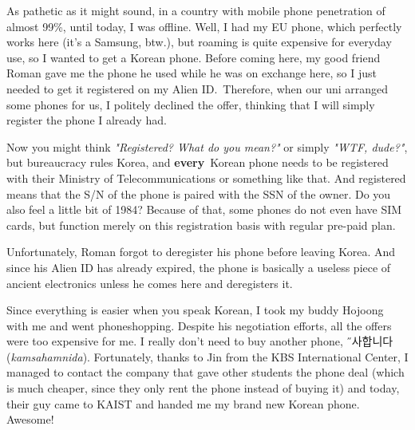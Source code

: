 \begin{post}
	\begin{content}
As pathetic as it might sound, in a country with mobile phone penetration of almost 99\%, until today, I was offline. Well, I had my EU phone, which perfectly works here (it's a Samsung, btw.), but roaming is quite expensive for everyday use, so I wanted to get a Korean phone. Before coming here, my good friend Roman gave me the phone he used while he was on exchange here, so I just needed to get it registered on my Alien ID. Therefore, when our uni arranged some phones for us, I politely declined the offer, thinking that I will simply register the phone I already had.

Now you might think \textit{"Registered? What do you mean?"} or simply \textit{"WTF, dude?"}, but bureaucracy rules Korea, and \textbf{every} Korean phone needs to be registered with their Ministry of Telecommunications or something like that. And registered means that the S/N of the phone is paired with the SSN of the owner. Do you also feel a little bit of 1984? Because of that, some phones do not even have SIM cards, but function merely on this registration basis with regular pre-paid plan.

Unfortunately, Roman forgot to deregister his phone before leaving Korea. And since his Alien ID has already expired, the phone is basically a useless piece of ancient electronics unless he comes here and deregisters it.

Since everything is easier when you speak Korean, I took my buddy Hojoong with me and went phoneshopping. Despite his negotiation efforts, all the offers were too expensive for me. I really don't need to buy another phone, {\H 감사합니다} (\textit{kamsahamnida}). Fortunately, thanks to Jin from the KBS International Center, I managed to contact the company that gave other students the phone deal (which is much cheaper, since they only rent the phone instead of buying it) and today, their guy came to KAIST and handed me my brand new Korean phone. Awesome!


\end{content}
\end{post}
